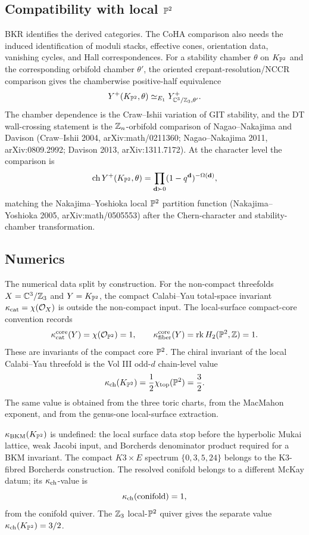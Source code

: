 \subsection*{Compatibility with local $\mathbb{P}^{2}$}

BKR identifies the derived categories. The CoHA comparison also needs
the induced identification of moduli stacks, effective cones,
orientation data, vanishing cycles, and Hall correspondences. For a
stability chamber $\theta$ on $K_{\mathbb{P}^2}$ and the corresponding orbifold
chamber $\theta'$, the oriented crepant-resolution/NCCR comparison gives
the chamberwise positive-half equivalence
\[
  Y^{+}(K_{\mathbb{P}^2},\theta)
  \simeq_{E_1}
  Y^{+}_{\mathbb{C}^3/\mathbb{Z}_3,\theta'} .
\]
The chamber dependence is the Craw--Ishii variation of GIT stability,
and the DT wall-crossing statement is the $\mathbb{Z}_n$-orbifold comparison
of Nagao--Nakajima and Davison (Craw--Ishii 2004, arXiv:math/0211360;
Nagao--Nakajima 2011, arXiv:0809.2992; Davison 2013,
arXiv:1311.7172). At the character level the comparison is
\[
  \mathrm{ch}\,Y^{+}(K_{\mathbb{P}^2},\theta)
  =
  \prod_{\mathbf{d}\succ 0}(1-q^{\mathbf{d}})^{-\Omega(\mathbf{d})},
\]
matching the Nakajima--Yoshioka local $\mathbb{P}^2$ partition function
(Nakajima--Yoshioka 2005, arXiv:math/0505553) after the
Chern-character and stability-chamber transformation.

\subsection*{Numerics}

The numerical data split by construction. For the non-compact
threefolds $X=\mathbb{C}^3/\mathbb{Z}_3$ and $Y=K_{\mathbb{P}^2}$, the compact Calabi--Yau
total-space invariant $\kappa_{\mathrm{cat}}=\chi(\mathcal O_X)$ is outside the
non-compact input. The local-surface compact-core convention records
\[
  \kappa_{\mathrm{cat}}^{\mathrm{core}}(Y)=\chi(\mathcal O_{\mathbb{P}^2})=1,
  \qquad
  \kappa_{\mathrm{fiber}}^{\mathrm{core}}(Y)=\operatorname{rk}H_2(\mathbb{P}^2,\mathbb{Z})=1 .
\]
These are invariants of the compact core $\mathbb{P}^2$. The chiral invariant
of the local Calabi--Yau threefold is the Vol III odd-$d$ chain-level
value
\[
  \kappa_{\mathrm{ch}}(K_{\mathbb{P}^2})
  =
  \frac{1}{2}\chi_{\mathrm{top}}(\mathbb{P}^2)
  =
  \frac{3}{2}.
\]
The same value is obtained from the three toric charts, from the
MacMahon exponent, and from the genus-one local-surface extraction.

$\kappa_{\mathrm{BKM}}(K_{\mathbb{P}^2})$ is undefined: the local surface data stop before the
hyperbolic Mukai lattice, weak Jacobi input, and Borcherds denominator
product required for a BKM invariant. The compact $K3\times E$ spectrum
$\{0,3,5,24\}$ belongs to the K3-fibred Borcherds construction.
The resolved conifold belongs to a different McKay datum; its
$\kappa_{\mathrm{ch}}$-value is
\[
  \kappa_{\mathrm{ch}}(\mathrm{conifold})=1,
\]
from the conifold quiver. The $\mathbb{Z}_3$ local-$\mathbb{P}^2$ quiver gives the
separate value $\kappa_{\mathrm{ch}}(K_{\mathbb{P}^2})=3/2$.
